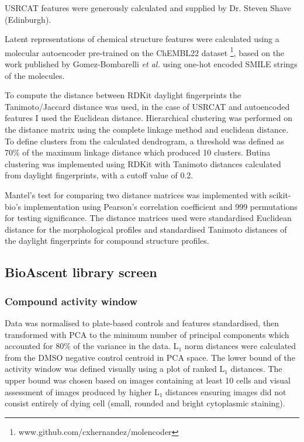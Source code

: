 \documentclass[a4paper,11pt,twoside,openright]{scrbook}
\begin{document}
USRCAT features were generously calculated and supplied by Dr. Steven Shave (Edinburgh).

Latent representations of chemical structure features were calculated using a molecular autoencoder pre-trained on the ChEMBL22 dataset \footnote{www.github.com/cxhernandez/molencoder}, based on the work published by Gomez-Bombarelli \textit{et al.} \cite{Gomez-Bombarelli2016} using one-hot encoded SMILE strings of the molecules.

To compute the distance between RDKit daylight fingerprints the Tanimoto/Jaccard distance was used, in the case of USRCAT and autoencoded features I used the Euclidean distance.
Hierarchical clustering was performed on the distance matrix using the complete linkage method and euclidean distance.
To define clusters from the calculated dendrogram, a threshold was defined as 70\% of the maximum linkage distance which produced 10 clusters.
Butina clustering was implemented using RDKit with Tanimoto distances calculated from daylight fingerprints, with a cutoff value of 0.2.

Mantel's test for comparing two distance matrices was implemented with scikit-bio's implementation using Pearson's correlation coefficient and 999 permutations for testing significance.
The distance matrices used were standardised Euclidean distance for the morphological profiles and standardised Tanimoto distances of the daylight fingerprints for compound structure profiles.


\subsection{BioAscent library screen}

\subsubsection{Compound activity window}
Data was normalised to plate-based controls and features standardised, then transformed with PCA to the minimum number of principal components which accounted for 80\% of the variance in the data.
L$_1$ norm distances were calculated from the DMSO negative control centroid in PCA space.
The lower bound of the activity window was defined visually using a plot of ranked L$_1$ distances.
The upper bound was chosen based on images containing at least 10 cells and visual assessment of images produced by higher L$_1$ distances ensuring images did not consist entirely of dying cell (small, rounded and bright cytoplasmic staining).
\end{document}
